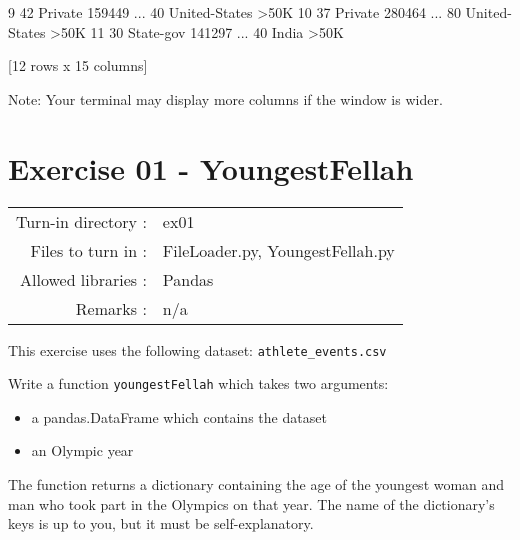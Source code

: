 \documentclass[]{article}
\newenvironment{Shaded}{\begin{snugshade}}{\end{snugshade}}
\newcommand{\DecValTok}[1]{\textcolor[rgb]{0.96,0.45,0.00}{#1}}
\newcommand{\NormalTok}[1]{\textcolor[rgb]{0.81,0.81,0.76}{#1}}
\newcommand{\OperatorTok}[1]{\textcolor[rgb]{0.81,0.81,0.76}{#1}}
\begin{document}
\begin{Shaded}
\begin{Highlighting}[]
\DecValTok{9}    \DecValTok{42}\NormalTok{           Private  }\DecValTok{159449}\NormalTok{  ...             }\DecValTok{40}\NormalTok{   United}\OperatorTok{-}\NormalTok{States   }\OperatorTok{>}\NormalTok{50K}
\DecValTok{10}   \DecValTok{37}\NormalTok{           Private  }\DecValTok{280464}\NormalTok{  ...             }\DecValTok{80}\NormalTok{   United}\OperatorTok{-}\NormalTok{States   }\OperatorTok{>}\NormalTok{50K}
\DecValTok{11}   \DecValTok{30}\NormalTok{         State}\OperatorTok{-}\NormalTok{gov  }\DecValTok{141297}\NormalTok{  ...             }\DecValTok{40}\NormalTok{           India   }\OperatorTok{>}\NormalTok{50K}

\NormalTok{[}\DecValTok{12}\NormalTok{ rows x }\DecValTok{15}\NormalTok{ columns]}
\end{Highlighting}
\end{Shaded}

Note: Your terminal may display more columns if the window is wider.

\clearpage

\hypertarget{exercise-01---youngestfellah-1}{%
\section{Exercise 01 -
YoungestFellah}\label{exercise-01---youngestfellah-1}}

\begin{longtable}[]{@{}rl@{}}
\toprule
\endhead
Turn-in directory : & ex01\tabularnewline
Files to turn in : & FileLoader.py, YoungestFellah.py\tabularnewline
Allowed libraries : & Pandas\tabularnewline
Remarks : & n/a\tabularnewline
\bottomrule
\end{longtable}

This exercise uses the following dataset: \texttt{athlete\_events.csv}

Write a function \texttt{youngestFellah} which takes two arguments:

\begin{itemize}
\item
  a pandas.DataFrame which contains the dataset
\item
  an Olympic year
\end{itemize}

The function returns a dictionary containing the age of the youngest
woman and man who took part in the Olympics on that year. The name of
the dictionary's keys is up to you, but it must be self-explanatory.
\end{document}
